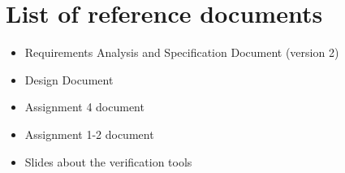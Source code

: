 \section{List of reference documents}
\begin{itemize}
	\item Requirements Analysis and Specification Document (version 2)
	\item Design Document
	\item Assignment 4 document
	\item Assignment 1-2 document
	\item Slides about the verification tools
\end{itemize}